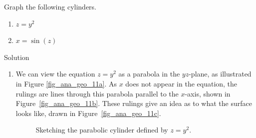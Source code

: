 \begin{example}\label{ex_space4}
Graph the following cylinders. 
\begin{multicols}{2}
\begin{enumerate}[align=left]
\item $z=y^2$ 
\item $x=\sin(z)$ 
\end{enumerate}
\end{multicols}

Solution 

\begin{enumerate}[align=left]
	\item We can view the equation $z=y^2$ as a parabola in the $yz$-plane, as illustrated in Figure \ref{fig_ana_geo_11a}. As $x$ does not appear in the equation, the rulings are lines through this parabola parallel to the $x$-axis, shown in Figure~\ref{fig_ana_geo_11b}. These rulings give an idea as to what the surface looks like, drawn in Figure~\ref{fig_ana_geo_11c}.

\begin{figure}[H]
\centering
\centerline{
\hspace{0.1cm}
\hspace{0.1cm}
}
\caption{Sketching the parabolic cylinder defined by $z=y^2$.}
\end{figure}


\end{enumerate}
\end{example}
